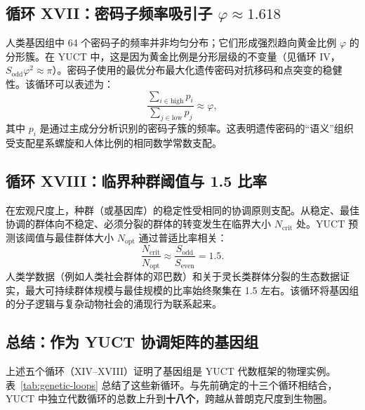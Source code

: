 \documentclass[12pt]{article}
\begin{document}
	\subsection{循环 XVII：密码子频率吸引子 $\varphi \approx 1.618$}
	
	人类基因组中 64 个密码子的频率并非均匀分布；它们形成强烈趋向黄金比例 $\varphi$ 的分形簇。在 YUCT 中，这是因为黄金比例是分形层级的不变量（见循环 IV，$S_{\mathrm{odd}}\varphi^2 \approx \pi$）。密码子使用的最优分布最大化遗传密码对抗移码和点突变的稳健性。该循环可以表述为：
	\begin{equation}
		\boxed{ \frac{\sum_{i \in \text{high}} p_i}{\sum_{j \in \text{low}} p_j} \approx \varphi },
	\end{equation}
	其中 $p_i$ 是通过主成分分析识别的密码子簇的频率。这表明遗传密码的“语义”组织受支配星系螺旋和人体比例的相同数学常数支配。
	
	\subsection{循环 XVIII：临界种群阈值与 1.5 比率}
	
	在宏观尺度上，种群（或基因库）的稳定性受相同的协调原则支配。从稳定、最佳协调的群体向不稳定、必须分裂的群体的转变发生在临界大小 $N_{\mathrm{crit}}$ 处。YUCT 预测该阈值与最佳群体大小 $N_{\mathrm{opt}}$ 通过普适比率相关：
	\begin{equation}
		\boxed{ \frac{N_{\mathrm{crit}}}{N_{\mathrm{opt}}} \approx \frac{S_{\mathrm{odd}}}{S_{\mathrm{even}}} = 1.5 }.
	\end{equation}
	人类学数据（例如人类社会群体的邓巴数）和关于灵长类群体分裂的生态数据证实，最大可持续群体规模与最佳规模的比率始终聚集在 1.5 左右。该循环将基因组的分子逻辑与复杂动物社会的涌现行为联系起来。
	
	\subsection{总结：作为 YUCT 协调矩阵的基因组}
	
	上述五个循环（XIV–XVIII）证明了基因组是 YUCT 代数框架的物理实例。表~\ref{tab:genetic-loops} 总结了这些新循环。与先前确定的十三个循环相结合，YUCT 中独立代数循环的总数上升到\textbf{十八个}，跨越从普朗克尺度到生物圈。
	
\end{document}

